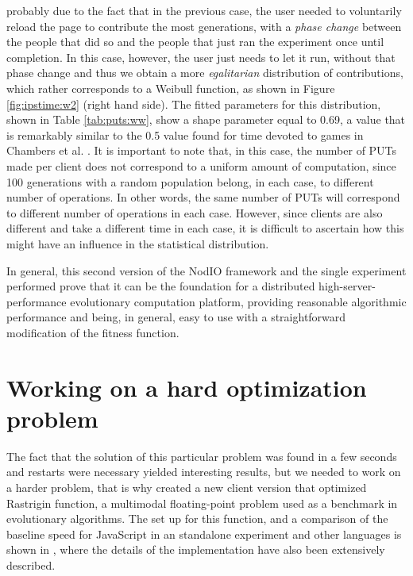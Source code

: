 \documentclass{sig-alternate}
\begin{document}
probably due to the fact that in the previous case, the user needed to
voluntarily reload the page to contribute the most generations, with a
{\em phase change} between the people that did so and the people that
just ran the experiment once until completion. In this case, however, the
user just needs to let it run, without that phase change and thus we obtain a
more {\em egalitarian} distribution of contributions, which rather
corresponds to a Weibull function, as shown in Figure
\ref{fig:ipstime:w2} (right hand side). The fitted parameters for this
distribution, shown in Table \ref{tab:puts:ww}, show a shape parameter
equal to 0.69, a value that is remarkably similar to the 0.5 value
found for time devoted to games in Chambers et
al. \cite{chambers2005measurement}. It is important to note that, in
this case, the number of PUTs made per client does not correspond to a
uniform amount of computation, since 100 generations with a random
population belong, in each case, to different number of
operations. In other words, the same number of PUTs will correspond to
different number of operations in each case. However, since clients
are also different and take a different time in each case, it is
difficult to ascertain how this might have an influence in the
statistical distribution.

In general, this second version of the {\sf NodIO} framework and the
single experiment performed prove that it can be the foundation for a distributed
high-server-performance evolutionary computation platform,
providing reasonable algorithmic performance and being, in general,
easy to use with a straightforward modification of the fitness
function. 

\section{Working on a hard optimization problem}
\label{sec:rastrigin}

The fact that the solution of this particular problem was found in a
few seconds and restarts were necessary yielded interesting results,
but we needed to work on a harder problem, that is why created a new
client version that optimized Rastrigin function, a multimodal
floating-point problem used as a benchmark in evolutionary
algorithms. The set up for this function, and a comparison of the
baseline speed for JavaScript in an standalone experiment and other
languages is shown in \cite{2016arXiv160101607Manom}, where the details of
the implementation have also been extensively described. 
\end{document}
